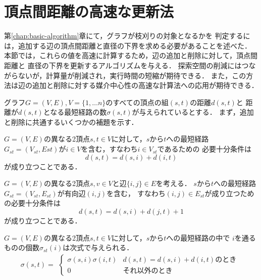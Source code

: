 \section{頂点間距離の高速な更新法}
\label{sect:faster-min-max}
第\ref{chap:basic-algorithm}章にて，グラフが枝刈りの対象となるかを
判定するには，追加する辺の頂点間距離と直径の下界を求める必要があることを述べた．
本節では，これらの値を高速に計算するため，辺の追加と削除に対して，頂点間距離と
直径の下界を更新するアルゴリズムを与える．
探索空間の削減にはつながらないが，計算量が削減され，実行時間の短縮が期待できる．
また，この方法は辺の追加と削除に対する媒介中心性の高速な計算法への応用が期待できる．

グラフ$G=(V,E),V=\{1,\ldots n\}$のすべての頂点の組$(s,t)$の距離$d(s,t)$と
距離が$d(s,t)$となる最短経路の数$\sigma(s,t)$が与えられているとする．
まず，追加と削除に共通するいくつかの補題を示す．
\begin{lemma-without-proof}
  $G=(V,E)$の異なる2頂点$s,t\in V$に対して，$s$から$t$への最短経路
  $G_{st}=(V_{st},E{st})$が$i\in V$を含む，すなわち$i\in V_{st}$であるための
  必要十分条件は
  \[ d(s,t)=d(s,i)+d(i,t) \]
  が成り立つことである．
\end{lemma-without-proof}
\begin{lemma-without-proof}
  $G=(V,E)$の異なる2頂点$s,v\in V$と辺$\{i,j\}\in E$を考える．
  $s$から$t$への最短経路$G_{st}=(V_{st},E_{st})$が有向辺$(i,j)$を含む，
  すなわち$(i,j)\in E_{st}$が成り立つための必要十分条件は
  \[ d(s,t)=d(s,i)+d(j,t)+1 \]
  が成り立つことである．
\end{lemma-without-proof}
\begin{lemma-without-proof}
  $G=(V,E)$の異なる2頂点$s,t\in V$に対して，$s$から$t$への最短経路の中で
  $i$を通るものの個数$\sigma_{st}(i)$は次式で与えられる．
  \[ \sigma(s,t)=\begin{aligned}\begin{cases}
    \sigma(s,i)\sigma(i,t) & d(s,t)=d(s,i)+d(i,t)\mathrm{のとき} \\
    0 & \mathrm{それ以外のとき}
  \end{cases}\end{aligned} \]
\end{lemma-without-proof}

